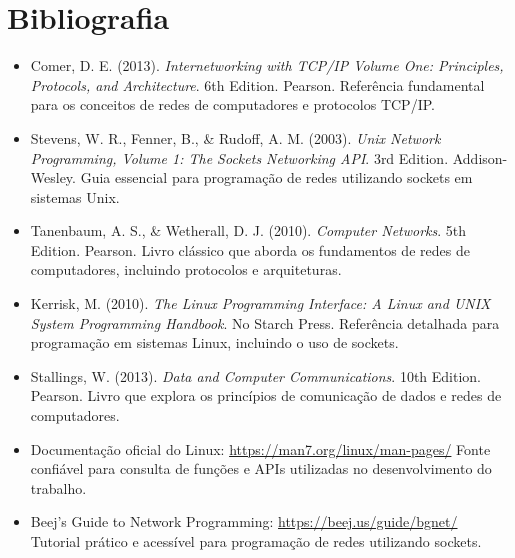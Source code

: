 \section*{Bibliografia}

\begin{itemize}
    \item Comer, D. E. (2013). \textit{Internetworking with TCP/IP Volume One: Principles, Protocols, and Architecture}. 6th Edition. Pearson.  
    Referência fundamental para os conceitos de redes de computadores e protocolos TCP/IP.

    \item Stevens, W. R., Fenner, B., & Rudoff, A. M. (2003). \textit{Unix Network Programming, Volume 1: The Sockets Networking API}. 3rd Edition. Addison-Wesley.  
    Guia essencial para programação de redes utilizando sockets em sistemas Unix.

    \item Tanenbaum, A. S., & Wetherall, D. J. (2010). \textit{Computer Networks}. 5th Edition. Pearson.  
    Livro clássico que aborda os fundamentos de redes de computadores, incluindo protocolos e arquiteturas.

    \item Kerrisk, M. (2010). \textit{The Linux Programming Interface: A Linux and UNIX System Programming Handbook}. No Starch Press.  
    Referência detalhada para programação em sistemas Linux, incluindo o uso de sockets.

    \item Stallings, W. (2013). \textit{Data and Computer Communications}. 10th Edition. Pearson.  
    Livro que explora os princípios de comunicação de dados e redes de computadores.

    \item Documentação oficial do Linux: \url{https://man7.org/linux/man-pages/}  
    Fonte confiável para consulta de funções e APIs utilizadas no desenvolvimento do trabalho.

    \item Beej's Guide to Network Programming: \url{https://beej.us/guide/bgnet/}  
    Tutorial prático e acessível para programação de redes utilizando sockets.
\end{itemize}